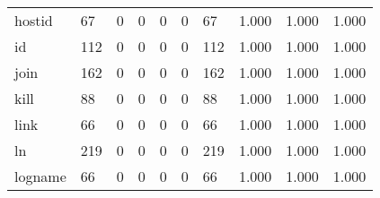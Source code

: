 \begin{longtable}{lp{1.3cm}p{1.3cm}p{1.3cm}p{1.3cm}p{1.3cm}p{1.3cm}p{1.3cm}p{1.3cm}p{1.3cm}}
hostid    &                     67 &                                             0 &                                            0 &                                           0 &                                            0 &                                         67 &                                1.000 &                                  1.000 &                                1.000 \\
id        &                    112 &                                             0 &                                            0 &                                           0 &                                            0 &                                        112 &                                1.000 &                                  1.000 &                                1.000 \\
join      &                    162 &                                             0 &                                            0 &                                           0 &                                            0 &                                        162 &                                1.000 &                                  1.000 &                                1.000 \\
kill      &                     88 &                                             0 &                                            0 &                                           0 &                                            0 &                                         88 &                                1.000 &                                  1.000 &                                1.000 \\
link      &                     66 &                                             0 &                                            0 &                                           0 &                                            0 &                                         66 &                                1.000 &                                  1.000 &                                1.000 \\
ln        &                    219 &                                             0 &                                            0 &                                           0 &                                            0 &                                        219 &                                1.000 &                                  1.000 &                                1.000 \\
logname   &                     66 &                                             0 &                                            0 &                                           0 &                                            0 &                                         66 &                                1.000 &                                  1.000 &                                1.000 \\

\end{longtable}
